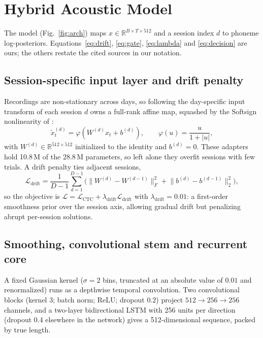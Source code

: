\documentclass[conference,a4paper,10pt]{IEEEtran}
\begin{document}
\section{Hybrid Acoustic Model}\label{sec:model}
The model (Fig.~\ref{fig:arch}) maps $x\in\mathbb{R}^{B\times T\times512}$ and a
session index $d$ to phoneme log-posteriors. Equations~\eqref{eq:drift}, \eqref{eq:gate},
\eqref{eq:lambda} and \eqref{eq:decision} are ours; the others restate the cited
sources in our notation.

\subsection{Session-specific input layer and drift penalty}
Recordings are non-stationary across days, so following the day-specific input
transform of \cite{willett2023speech} each session $d$ owns a full-rank affine
map, squashed by the Softsign nonlinearity of \cite{glorot2010understanding}:
\begin{equation}\label{eq:adapter}
\tilde{x}_t^{(d)}=\varphi\!\left(W^{(d)}x_t+b^{(d)}\right),\qquad
\varphi(u)=\frac{u}{1+|u|},
\end{equation}
with $W^{(d)}\in\mathbb{R}^{512\times512}$ initialized to the identity and
$b^{(d)}=0$. These adapters hold 10.8\,M of the 28.8\,M parameters, so left
alone they overfit sessions with few trials. A drift penalty ties adjacent
sessions,
\begin{equation}\label{eq:drift}
\mathcal{L}_{\text{drift}}=\frac{1}{D-1}\sum_{d=1}^{D-1}
\Big(\big\|W^{(d)}-W^{(d-1)}\big\|_F^2+\big\|b^{(d)}-b^{(d-1)}\big\|_2^2\Big),
\end{equation}
so the objective is
$\mathcal{L}=\mathcal{L}_{\text{CTC}}+\lambda_{\text{drift}}\mathcal{L}_{\text{drift}}$
with $\lambda_{\text{drift}}=0.01$: a first-order smoothness prior over the
session axis, allowing gradual drift but penalizing abrupt per-session solutions.

\subsection{Smoothing, convolutional stem and recurrent core}
A fixed Gaussian kernel ($\sigma=2$ bins, truncated at an absolute value of
$0.01$ and renormalized) runs as a depthwise temporal convolution. Two
convolutional blocks (kernel 3; batch norm; ReLU; dropout $0.2$) project
$512\rightarrow256\rightarrow256$ channels, and a two-layer bidirectional LSTM
with 256 units per direction (dropout 0.4 elsewhere in the network) gives a 512-dimensional sequence, packed by true
length.
\end{document}
